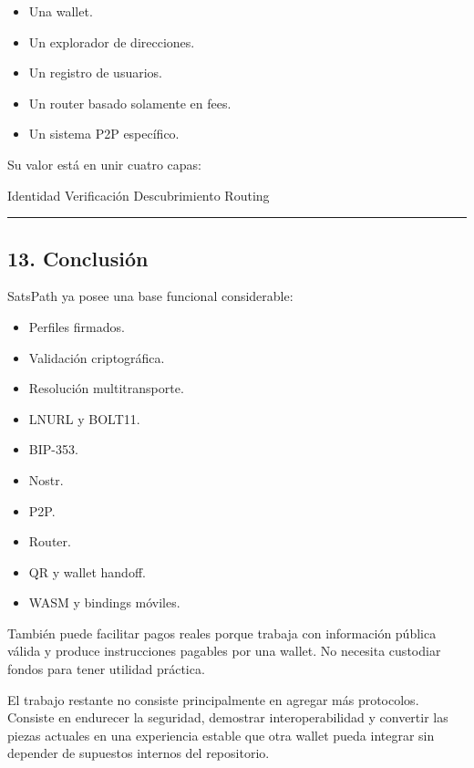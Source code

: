 \documentclass[
]{article}
\newenvironment{Shaded}{}{}
\newcommand{\NormalTok}[1]{#1}
\providecommand{\tightlist}{%
  \setlength{\itemsep}{0pt}\setlength{\parskip}{0pt}}
\begin{document}
\begin{itemize}
\tightlist
\item
  Una wallet.
\item
  Un explorador de direcciones.
\item
  Un registro de usuarios.
\item
  Un router basado solamente en fees.
\item
  Un sistema P2P específico.
\end{itemize}

Su valor está en unir cuatro capas:

\begin{Shaded}
\begin{Highlighting}[]
\NormalTok{Identidad}
\NormalTok{Verificación}
\NormalTok{Descubrimiento}
\NormalTok{Routing}
\end{Highlighting}
\end{Shaded}

\begin{center}\rule{0.5\linewidth}{0.5pt}\end{center}

\hypertarget{conclusiuxf3n}{%
\subsection{13. Conclusión}\label{conclusiuxf3n}}

SatsPath ya posee una base funcional considerable:

\begin{itemize}
\tightlist
\item
  Perfiles firmados.
\item
  Validación criptográfica.
\item
  Resolución multitransporte.
\item
  LNURL y BOLT11.
\item
  BIP-353.
\item
  Nostr.
\item
  P2P.
\item
  Router.
\item
  QR y wallet handoff.
\item
  WASM y bindings móviles.
\end{itemize}

También puede facilitar pagos reales porque trabaja con información
pública válida y produce instrucciones pagables por una wallet. No
necesita custodiar fondos para tener utilidad práctica.

El trabajo restante no consiste principalmente en agregar más
protocolos. Consiste en endurecer la seguridad, demostrar
interoperabilidad y convertir las piezas actuales en una experiencia
estable que otra wallet pueda integrar sin depender de supuestos
internos del repositorio.
\end{document}
